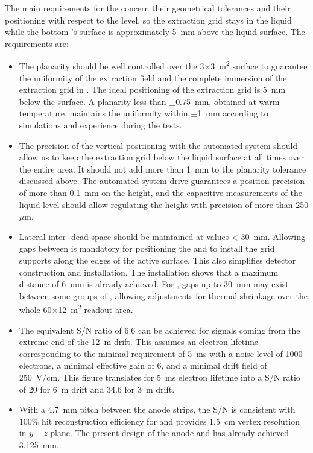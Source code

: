 The main requirements for the  concern their geometrical tolerances and their positioning with respect to the  level, so the extraction grid stays in the liquid while the bottom 's surface is approximately \SI{5}{\mm} above the liquid surface. The requirements are:
\begin{itemize}
\item{ The  planarity should be well controlled over the \num{3}$\times$\SI{3}{\m^{2}} surface to guarantee the uniformity  of  the extraction field and the complete immersion of the extraction grid in .  The ideal positioning of the 
extraction grid is \SI{5}{\mm} below the  surface. A planarity less than $\pm$\SI{0.75}{\mm}, obtained at  warm temperature, maintains the uniformity within $\pm$\SI{1}{\mm} according to simulations and  experience during the  \coldbox tests. } 

\item{The precision of the  vertical positioning with the automated system should allow us to keep the extraction grid below the liquid surface at all times over the entire  area. It should not add more  than  \SI{1}{\mm} to the planarity tolerance discussed above. The automated system drive guarantees a position precision of more than \SI{0.1}{\mm} on the  height, and the capacitive measurements of the liquid level should allow regulating the height with precision of more than  \num{250}$\mu$m}.

\item{Lateral inter- dead space should be maintained at values %
< \SI{30}{mm}.
Allowing gaps between  is mandatory for positioning the  and to install the grid supports along the edges of the active  surface. This also simplifies detector construction and installation. The  installation shows that a maximum distance of  \SI{6}{\mm}  is already achieved. 
For  , gaps up to \SI{30}{\mm} may  exist between some groups of , allowing adjustments for thermal shrinkage over the whole  \num{60}$\times$\SI{12}{\m^{2}} readout area.}

\item{The equivalent S/N ratio of \num{6.6} can be achieved for signals coming from the extreme end of the \SI{12}{\m} drift. This assumes an electron lifetime corresponding to  the minimal requirement of \SI{5}{\ms} with a noise level of \num{1000} electrons, a minimal  effective  gain of \num{6}, and a minimal drift field of \SI{250}{V/cm}. This figure translates for \SI{5}{\ms} electron lifetime into a S/N ratio of  \num{20} for \SI{6}{\m} drift and \num{34.6} for \SI{3}{\m} drift. }

\item{With a \SI{4.7}{\mm} pitch between the anode strips, the S/N is consistent with 100\% hit reconstruction efficiency for   and provides \SI{1.5}{cm} vertex resolution in $y-z$ plane.
The present  design of the anode and  has already achieved \SI{3.125}{\mm}}.
\end{itemize}
